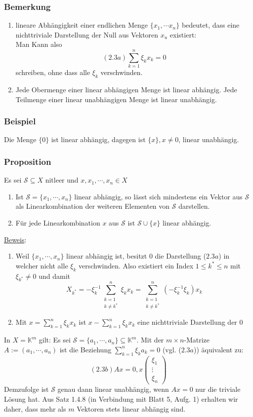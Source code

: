 \subsubsection{Bemerkung}
\renewcommand{\labelenumi}{(\arabic{enumi})}
\begin{enumerate}
\item lineare Abhängigkeit einer endlichen Menge $\{x_1,\cdots x_n\}$ bedeutet, dass eine nichttriviale Darstellung der Null aus Vektoren $x_u$ existiert:\\
Man Kann also
\[(2.3a) \sum_{k=1}^n \xi _kx_k = 0\]
schreiben, ohne dass alle $\xi _k$ verschwinden.
\item Jede Obermenge einer linear abhängigen Menge ist linear abhängig.  Jede Teilmenge einer linear unabhängigen Menge ist linear unabhängig.
\end{enumerate}
\subsubsection{Beispiel}
Die Menge $\{0\}$ ist linear abhängig, dagegen ist $\{x\},x\not= 0$, linear unabhängig.
\subsubsection{Proposition}
Es sei $\mathcal{S}\subseteq X$ nitleer und $x,x_1,\cdots ,x_n \in X$
\renewcommand{\labelenumi}{(\alph{enumi})}
\begin{enumerate}
\item Ist $\mathcal{S}=\{x_1, \cdots ,x_n\}$ linear abhängig, so lässt sich mindestens ein Vektor aus $\mathcal{S}$ als Linearkombination der weiteren Elementen von $\mathcal{S}$ darstellen.
\item Für jede Linearkombination $x$ aus $\mathcal{S}$ ist $\mathcal{S}\cup \{x\}$ linear abhängig.
\end{enumerate}
\underline{Beweis}:
\begin{enumerate}
\item Weil $\{x_1,\cdots ,x_n\}$ linear abhängig ist, besitzt $0$ die Darstellung ($2.3a$) in welcher nicht alle $\xi _k$ verschwinden.  Also existiert ein Index $1\leq k^*\leq n$ mit $\xi _{k^*} \not= 0$ und damit
\[X_{k^*} = -\xi _k^{-1} \sum_{\substack{k=1\\ k\not=k^*}}^n \xi _k x_k =\sum_{\substack{k=1\\ k\not=k^*}}^n (-\xi _k^{-1} \xi _k) x_k\]
\item Mit $x=\sum_{k=1}^n\xi _k x_k$ ist $x - \sum_{k=1}^n \xi _k x_k$ eine nichttriviale Darstellung der $0$
\end{enumerate}
In $X=\mathbb{K}^m$ gilt: Es sei $\mathcal{S}=\{a_1,\cdots ,a_n\}\subseteq \mathbb{K}^m$.  Mit der $m\times n$-Matrize $A:= (a_1,\cdots ,a_n)$ ist die Beziehung $\sum^n_{k=1} \xi _k a_k =0$ (vgl. ($2.3a$)) äquivalent zu:
\[ (2.3b) Ax=0, x\begin{pmatrix}\xi _1 \\ \vdots \\ \xi_n\end{pmatrix}\]
Demzufolge ist $\mathcal{S}$ genau dann linear unabhängig, wenn $Ax=0$ nur die triviale Lösung hat.  Aus Satz 1.4.8 (in Verbindung mit Blatt 5, Aufg. 1) erhalten wir daher, dass mehr als $m$ Vektoren stets linear abhängig sind.
